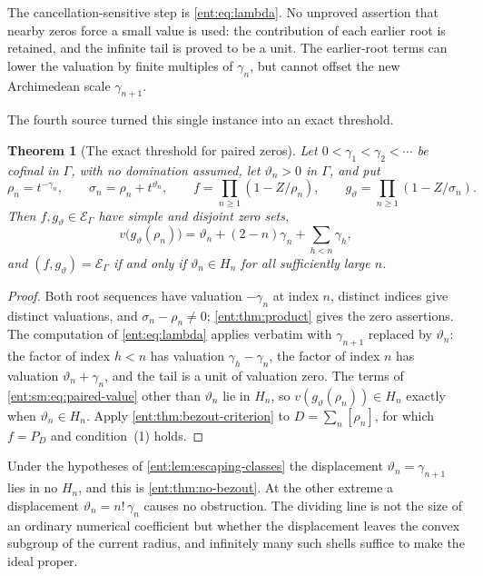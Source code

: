 \documentclass[11pt]{article}
\newtheorem{theorem}{Theorem}[section]
\theoremstyle{plain}
\theoremstyle{plain}
\theoremstyle{plain}
\theoremstyle{definition}
\theoremstyle{definition}
\theoremstyle{definition}
\theoremstyle{definition}
\theoremstyle{remark}
\newcommand{\E}{\mathcal E_\Gamma}
\begin{document}
The cancellation-sensitive step is \eqref{ent:eq:lambda}. No unproved
assertion that nearby zeros force a small value is used: the contribution of
each earlier root is retained, and the infinite tail is proved to be a unit.
The earlier-root terms can lower the valuation by finite multiples of
$\gamma_n$, but cannot offset the new Archimedean scale $\gamma_{n+1}$.

The fourth source turned this single instance into an exact threshold.

\begin{theorem}[The exact threshold for paired zeros]\label{ent:sm:thm:paired}
Let $0<\gamma_1<\gamma_2<\cdots$ be cofinal in $\Gamma$, with no domination
assumed, let $\vartheta_n>0$ in $\Gamma$, and put
\[
 \rho_n=t^{-\gamma_n},\qquad
 \sigma_n=\rho_n+t^{\vartheta_n},\qquad
 f=\prod_{n\ge1}(1-Z/\rho_n),\qquad
 g_\vartheta=\prod_{n\ge1}(1-Z/\sigma_n).
\]
Then $f,g_\vartheta\in\E$ have simple and disjoint zero sets,
\begin{equation}\label{ent:sm:eq:paired-value}
 v\bigl(g_\vartheta(\rho_n)\bigr)
 =\vartheta_n+(2-n)\gamma_n+\sum_{h<n}\gamma_h,
\end{equation}
and $(f,g_\vartheta)=\E$ if and only if $\vartheta_n\in H_n$ for all
sufficiently large $n$.
\end{theorem}
\begin{proof}
Both root sequences have valuation $-\gamma_n$ at index $n$, distinct indices
give distinct valuations, and $\sigma_n-\rho_n\ne0$; \cref{ent:thm:product}
gives the zero assertions. The computation of \eqref{ent:eq:lambda} applies
verbatim with $\gamma_{n+1}$ replaced by $\vartheta_n$: the factor of index
$h<n$ has valuation $\gamma_h-\gamma_n$, the factor of index $n$ has
valuation $\vartheta_n+\gamma_n$, and the tail is a unit of valuation zero.
The terms of \eqref{ent:sm:eq:paired-value} other than $\vartheta_n$ lie in
$H_n$, so $v(g_\vartheta(\rho_n))\in H_n$ exactly when $\vartheta_n\in H_n$.
Apply \cref{ent:thm:bezout-criterion} to $D=\sum_n[\rho_n]$, for which
$f=P_D$ and condition~(1) holds.
\end{proof}

Under the hypotheses of \cref{ent:lem:escaping-classes} the displacement
$\vartheta_n=\gamma_{n+1}$ lies in no $H_n$, and this is
\cref{ent:thm:no-bezout}. At the other extreme a displacement
$\vartheta_n=n!\,\gamma_n$ causes no obstruction. The dividing line is not
the size of an ordinary numerical coefficient but whether the displacement
leaves the convex subgroup of the current radius, and infinitely many such
shells suffice to make the ideal proper.
\end{document}
